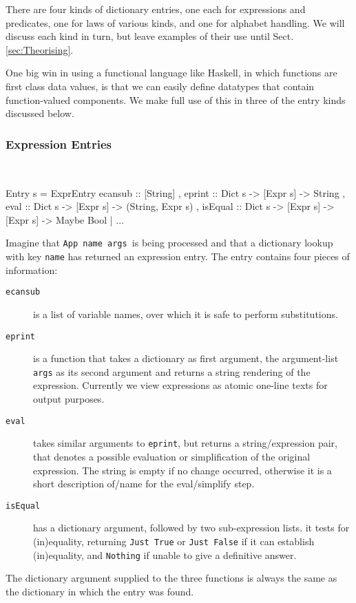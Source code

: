 There are four kinds of dictionary entries,
one each for expressions and predicates,
one for laws of various kinds,
and one for alphabet handling.
We will discuss each kind in turn,
but leave examples of their use until Sect.\ref{sec:Theorising}.

One big win in using a functional language like Haskell,
in which functions are first class data values,
is that we can easily define datatypes that
contain function-valued components.
We make full use of this in three of the entry kinds discussed below.


\subsubsection{Expression Entries}~

\begin{code}
Entry s
  = ExprEntry
    { ecansub :: [String]
    , eprint :: Dict s -> [Expr s] -> String
    , eval :: Dict s -> [Expr s] -> (String, Expr s)
    , isEqual :: Dict s -> [Expr s] -> [Expr s] -> Maybe Bool}
  | ...
\end{code}
Imagine that \texttt{App name args }is being processed
and that a dictionary lookup with key \texttt{name}
has returned an expression entry.
The entry contains four pieces of information:
\begin{description}
  \item[\texttt{ecansub}]
     is a list of variable names,
      over which it is safe to perform substitutions.
  \item[\texttt{eprint}]
    is a function that takes a dictionary as first argument,
    the argument-list \texttt{args} as its second argument
    and returns a string rendering of the expression.
    Currently we view expressions as atomic one-line texts
    for output purposes.
  \item[\texttt{eval}]
    takes similar arguments to \texttt{eprint},
    but returns a string/expression pair,
    that denotes a possible evaluation or simplification
    of the original expression.
    The string is empty if no change occurred,
    otherwise it is a short description of/name for the eval/simplify step.
  \item[\texttt{isEqual}]
    has a dictionary argument, followed by two sub-expression lists.
    it tests for (in)equality, returning \texttt{Just True} or \texttt{Just False}
    if it can establish (in)equality,
    and \texttt{Nothing} if unable to give a definitive answer.
\end{description}
The dictionary argument supplied to the three functions
is always the same as the dictionary in which the entry was found.

